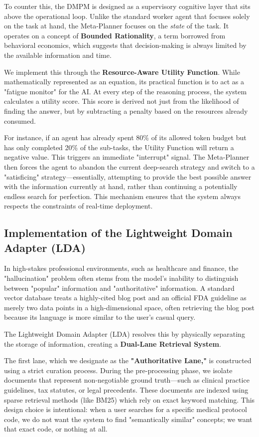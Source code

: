 \documentclass[12pt,en]{elegantpaper}
\begin{document}
To counter this, the DMPM is designed as a supervisory cognitive layer that sits above the operational loop. Unlike the standard worker agent that focuses solely on the task at hand, the Meta-Planner focuses on the \textit{state} of the task. It operates on a concept of \textbf{Bounded Rationality}, a term borrowed from behavioral economics, which suggests that decision-making is always limited by the available information and time.

We implement this through the \textbf{Resource-Aware Utility Function}. While mathematically represented as an equation, its practical function is to act as a "fatigue monitor" for the AI. At every step of the reasoning process, the system calculates a utility score. This score is derived not just from the likelihood of finding the answer, but by subtracting a penalty based on the resources already consumed. 

For instance, if an agent has already spent 80\% of its allowed token budget but has only completed 20\% of the sub-tasks, the Utility Function will return a negative value. This triggers an immediate "interrupt" signal. The Meta-Planner then forces the agent to abandon the current deep-search strategy and switch to a "satisficing" strategy—essentially, attempting to provide the best possible answer with the information currently at hand, rather than continuing a potentially endless search for perfection. This mechanism ensures that the system always respects the constraints of real-time deployment.

\subsection{Implementation of the Lightweight Domain Adapter (LDA)}

In high-stakes professional environments, such as healthcare and finance, the "hallucination" problem often stems from the model's inability to distinguish between "popular" information and "authoritative" information. A standard vector database treats a highly-cited blog post and an official FDA guideline as merely two data points in a high-dimensional space, often retrieving the blog post because its language is more similar to the user's casual query.

The Lightweight Domain Adapter (LDA) resolves this by physically separating the storage of information, creating a \textbf{Dual-Lane Retrieval System}. 

The first lane, which we designate as the \textbf{"Authoritative Lane,"} is constructed using a strict curation process. During the pre-processing phase, we isolate documents that represent non-negotiable ground truth—such as clinical practice guidelines, tax statutes, or legal precedents. These documents are indexed using sparse retrieval methods (like BM25) which rely on exact keyword matching. This design choice is intentional: when a user searches for a specific medical protocol code, we do not want the system to find "semantically similar" concepts; we want that exact code, or nothing at all.
\end{document}
